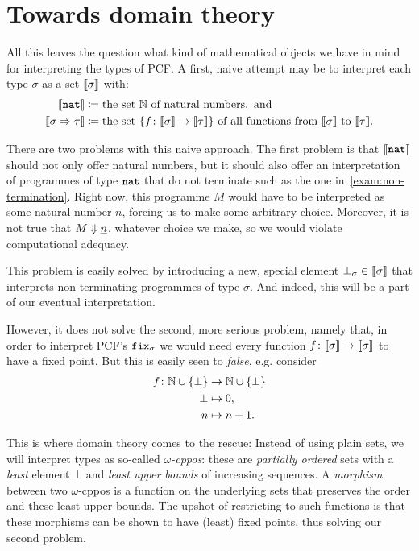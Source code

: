 \section{Towards domain theory}

All this leaves the question what kind of mathematical objects we have in mind
for interpreting the types of PCF. A first, naive attempt may be to interpret
each type \(\sigma\) as a set \(\llbracket\sigma\rrbracket\) with:
\begin{align*}
  \llbracket\texttt{\textbf{nat}}\rrbracket &\coloneqq \text{the set \(\mathbb N\) of natural numbers}, \text{ and} \\
  \llbracket\sigma \Rightarrow \tau\rrbracket &\coloneqq \text{the set \(\{f \colon \llbracket\sigma\rrbracket \to
    \llbracket\tau\rrbracket\}\) of all functions from \(\llbracket\sigma\rrbracket\) to \(\llbracket\tau\rrbracket\)}.
\end{align*}

There are two problems with this naive approach.
%
The first problem is that \(\llbracket\texttt{\textbf{nat}}\rrbracket\) should not only offer natural
numbers, but it should also offer an interpretation of programmes of type
\(\texttt{\textbf{nat}}\) that do not terminate such as the one
in~\cref{exam:non-termination}.
%
Right now, this programme \(M\) would have to be interpreted as some natural
number \(n\), forcing us to make some arbitrary choice. Moreover, it is not true
that \(M \Downarrow \underline{n}\), whatever choice we make, so we would violate
computational adequacy.

This problem is easily solved by introducing a new, special element
\(\bot_\sigma \in \llbracket\sigma\rrbracket\) that interprets non-terminating programmes
of type \(\sigma\). And indeed, this will be a part of our eventual interpretation.

However, it does not solve the second, more serious problem, namely that, in
order to interpret PCF's \(\operatorname{\texttt{fix}}_\sigma\) we would need every function
\(f \colon \llbracket\sigma\rrbracket \to \llbracket\sigma\rrbracket\) to have a fixed point.
%
But this is easily seen to \emph{false}, e.g. consider
\begin{align*}
  f \colon \mathbb N \cup \{\bot\} &\to \mathbb N \cup \{\bot\} \\
  \bot &\mapsto 0, \\
  n &\mapsto n+1.
\end{align*}

This is where domain theory comes to the rescue: Instead of using plain sets, we
will interpret types as so-called \emph{\(\omega\)-cppos}: these are
\emph{partially ordered} sets with a \emph{least} element \(\bot\) and
\emph{least upper bounds} of increasing sequences.
%
A \emph{morphism} between two \(\omega\)-cppos is a function on the underlying
sets that preserves the order and these least upper bounds.
%
The upshot of restricting to such functions is that these morphisms can be shown
to have (least) fixed points, thus solving our second problem.

